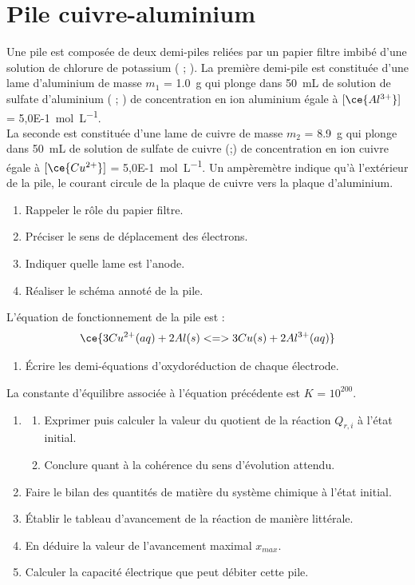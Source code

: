 \documentclass[a4paper,11pt,fleqn]{article}%
\begin{document}
\section{Pile cuivre-aluminium}
Une pile est composée de deux demi-piles reliées par un papier filtre imbibé d'une solution de chlorure de potassium ( ; ). La première demi-pile est constituée d'une lame d'aluminium de masse $m_1$ = \SI{1,0}{\gram} qui plonge dans \SI{50}{\milli\liter} de solution de sulfate d'aluminium ( ; ) de concentration en ion aluminium  égale à $[\ce{Al^{3+}}]$ = \SI{5,0E-1}{\mole\per\liter}.\\
La seconde est constituée d'une lame de cuivre de masse $m_2$ = \SI{8,9}{\gram} qui plonge dans \SI{50}{mL} de solution de sulfate de cuivre (;) de concentration en ion cuivre  égale à $[\ce{Cu^{2+}}]$ = \SI{5,0E-1}{\mole\per\liter}. Un ampèremètre indique qu'à l'extérieur de la pile, le courant circule de la plaque de cuivre vers la plaque d'aluminium.
\begin{enumerate}
    \item Rappeler le rôle du papier filtre.
    \item Préciser le sens de déplacement des électrons.
    \item Indiquer quelle lame est l'anode.
    \item Réaliser le schéma annoté de la pile.
\end{enumerate}
L'équation de fonctionnement de la pile est :
$$\ce{3 Cu^{2+}(aq) + 2 Al(s) <=> 3 Cu(s) + 2 Al^{3+}(aq)}$$
\begin{enumerate}[resume]
    \item Écrire les demi-équations  d'oxydoréduction de chaque électrode.
\end{enumerate}
La constante d'équilibre associée à l'équation précédente est $K$ = $10^{200}$.
\begin{enumerate}[resume]
    \item \begin{enumerate}
        \item Exprimer puis calculer la valeur du quotient de la réaction $Q_{r,i}$ à l'état initial.
        \item Conclure  quant à la cohérence du sens d'évolution attendu.
    \end{enumerate}
    \item Faire le bilan des quantités de matière du système chimique à l'état initial.
    \item Établir le tableau d'avancement de la réaction de manière littérale.
    \item En déduire la valeur de l'avancement maximal $x_{max}$.
    \item Calculer la capacité électrique que peut débiter cette pile.
\end{enumerate}
\end{document}
